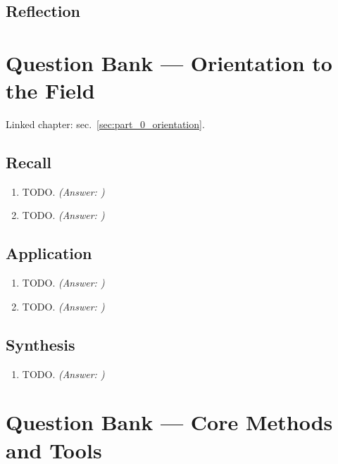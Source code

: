 \documentclass[
]{article}
\theoremstyle{plain}
\theoremstyle{definition}
\begin{document}
\subsection{Reflection}\label{reflection-11}

\newpage

\section{Question Bank --- Orientation to the
Field}\label{sec:q_part_0_orientation}

Linked chapter: sec.~\ref{sec:part_0_orientation}.

\subsection{Recall}\label{recall}

\begin{enumerate}
\def\labelenumi{\arabic{enumi}.}
\item
  TODO. \emph{(Answer: )}
\item
  TODO. \emph{(Answer: )}
\end{enumerate}

\subsection{Application}\label{application}

\begin{enumerate}
\def\labelenumi{\arabic{enumi}.}
\setcounter{enumi}{2}
\item
  TODO. \emph{(Answer: )}
\item
  TODO. \emph{(Answer: )}
\end{enumerate}

\subsection{Synthesis}\label{synthesis}

\begin{enumerate}
\def\labelenumi{\arabic{enumi}.}
\setcounter{enumi}{4}
\item
  TODO. \emph{(Answer: )}
\end{enumerate}

\newpage

\section{Question Bank --- Core Methods and
Tools}\label{sec:q_part_0_core_methods}
\end{document}
